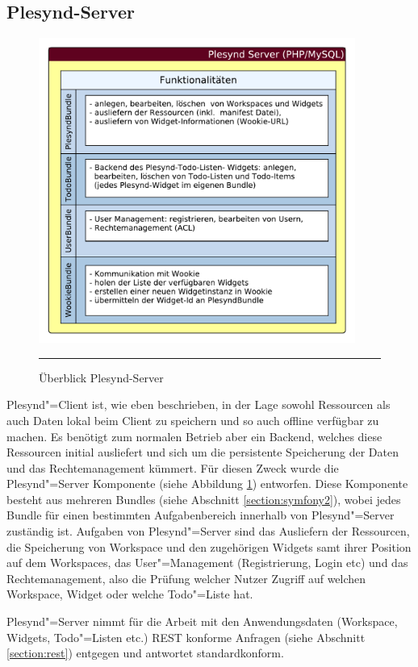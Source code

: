 \subsection{Plesynd-Server}
\begin{figure}
  \centering
  \includegraphics[height=10cm,keepaspectratio]{./Figures/konzeptionelle_loesung_plesynd_server.pdf}
    \rule{35em}{0.5pt}
  \caption[Überblick Plesynd-Server]{Überblick Plesynd-Server}
  \label{fig:ueberblick_plesynd_server}
\end{figure}
Plesynd"=Client ist, wie eben beschrieben, in der Lage sowohl Ressourcen als auch Daten lokal beim Client zu speichern und so auch offline verfügbar zu machen. Es benötigt zum normalen Betrieb aber ein Backend, welches diese Ressourcen initial ausliefert und sich um die persistente Speicherung der Daten und das Rechtemanagement kümmert. Für diesen Zweck wurde die Plesynd"=Server Komponente (siehe Abbildung \ref{fig:ueberblick_plesynd_server}) entworfen. Diese Komponente besteht aus mehreren Bundles (siehe Abschnitt \ref{section:symfony2}), wobei jedes Bundle für einen bestimmten Aufgabenbereich innerhalb  von Plesynd"=Server zuständig ist. Aufgaben von Plesynd"=Server sind das Ausliefern der Ressourcen, die Speicherung von Workspace und den zugehörigen Widgets samt ihrer Position auf dem Workspaces, das User"=Management (Registrierung, Login etc) und das Rechtemanagement, also die Prüfung welcher Nutzer Zugriff auf welchen Workspace, Widget oder welche Todo"=Liste hat. 

Plesynd"=Server nimmt für die Arbeit mit den Anwendungsdaten (Workspace, Widgets, Todo"=Listen etc.) REST konforme Anfragen (siehe Abschnitt \ref{section:rest}) entgegen und antwortet standardkonform.

